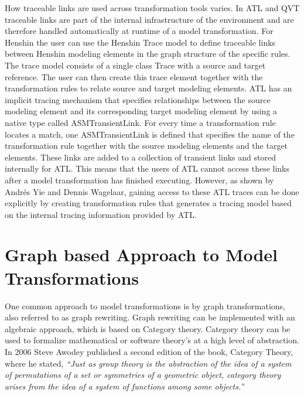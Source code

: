 How traceable links are used across transformation tools varies. In ATL
and QVT traceable links are part of the internal infrastructure of the
environment and are therefore handled automatically at runtime of a model
transformation. For Henshin the user can use the Henshin Trace model to define
traceable links between Henshin modeling elements in the graph structure of the
specific rules. The trace model consists of a single class Trace with a source
and target reference. The user can then create this trace element together with
the transformation rules to relate source and target modeling elements. ATL has
an implicit tracing mechanism that specifies relationships between the source
modeling element and its corresponding target modeling element by using a
native type called ASMTransientLink\cite{Wagelaar}. For every time a
transformation rule locates a match, one ASMTransientLink is defined that
specifies the name of the transformation rule together with the source modeling
elements and the target elements. These links are added to a collection of
transient links and stored internally for ATL. This means that the users of ATL
cannot access these links after a model transformation has finished executing.
However, as shown by Andr\'{e}s Yie and Dennis Wagelaar\cite{Wagelaar},
gaining access to these ATL traces can be done explicitly by creating
transformation rules that generates a tracing model based on the internal
tracing information provided by ATL.


\section{Graph based Approach to Model Transformations} 
\label{sec:graph_based}

One common approach to model transformations is by graph transformations,
also referred to as graph rewriting. Graph rewriting can be implemented with
an algebraic approach, which is based on Category
theory\cite{Herrlich1973,Barr1990}. Category theory can be used to formalize
mathematical or software theory's at a high level of abstraction. In 2006 Steve
Awodey published a second edition of the book, Category Theory, where he
stated, \textit{``Just as group theory is the abstraction of the idea of a
system of permutations of a set or symmetries of a geometric object, category
theory arises from the idea of a system of functions among some
objects\cite{Awodey2006}.''}

